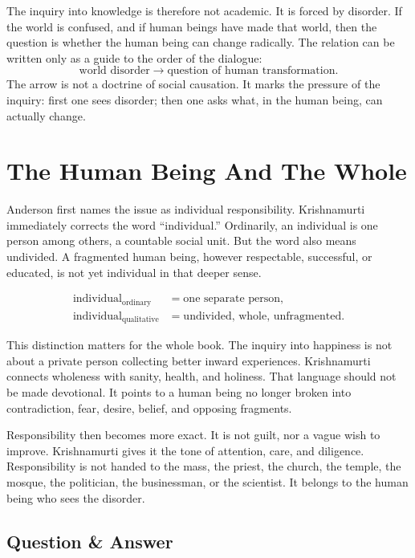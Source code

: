 \documentclass[11pt,oneside]{book}
\begin{document}
The inquiry into knowledge is therefore not academic. It is forced by disorder. If the world is confused, and if human beings have made that world, then the question is whether the human being can change radically. The relation can be written only as a guide to the order of the dialogue:
\begin{equation}
\text{world disorder}
\longrightarrow
\text{question of human transformation}.
\end{equation}
The arrow is not a doctrine of social causation. It marks the pressure of the inquiry: first one sees disorder; then one asks what, in the human being, can actually change.

\section{The Human Being And The Whole}

Anderson first names the issue as individual responsibility. Krishnamurti immediately corrects the word ``individual.'' Ordinarily, an individual is one person among others, a countable social unit. But the word also means undivided. A fragmented human being, however respectable, successful, or educated, is not yet individual in that deeper sense.

\begin{align}
\text{individual}_{\text{ordinary}}
&= \text{one separate person},\\
\text{individual}_{\text{qualitative}}
&= \text{undivided, whole, unfragmented}.
\end{align}

This distinction matters for the whole book. The inquiry into happiness is not about a private person collecting better inward experiences. Krishnamurti connects wholeness with sanity, health, and holiness. That language should not be made devotional. It points to a human being no longer broken into contradiction, fear, desire, belief, and opposing fragments.

Responsibility then becomes more exact. It is not guilt, nor a vague wish to improve. Krishnamurti gives it the tone of attention, care, and diligence. Responsibility is not handed to the mass, the priest, the church, the temple, the mosque, the politician, the businessman, or the scientist. It belongs to the human being who sees the disorder.

\subsection{Question \& Answer}
\end{document}
